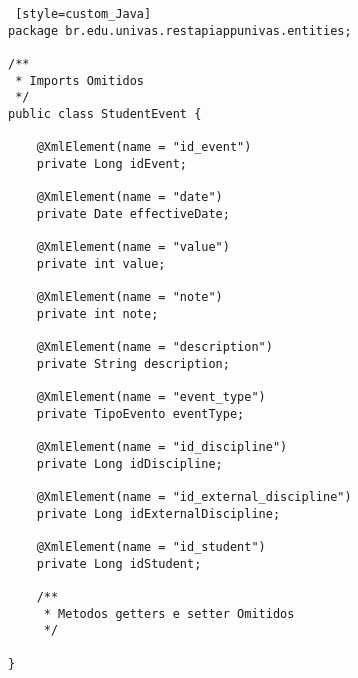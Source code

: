 \begin{lstlisting} [style=custom_Java]
package br.edu.univas.restapiappunivas.entities;

/**
 * Imports Omitidos
 */
public class StudentEvent {

	@XmlElement(name = "id_event")
	private Long idEvent;

	@XmlElement(name = "date")
	private Date effectiveDate;

	@XmlElement(name = "value")
	private int value;

	@XmlElement(name = "note")
	private int note;

	@XmlElement(name = "description")
	private String description;

	@XmlElement(name = "event_type")
	private TipoEvento eventType;

	@XmlElement(name = "id_discipline")
	private Long idDiscipline;

	@XmlElement(name = "id_external_discipline")
	private Long idExternalDiscipline;

	@XmlElement(name = "id_student")
	private Long idStudent;

	/**
	 * Metodos getters e setter Omitidos
	 */

}

\end{lstlisting}
